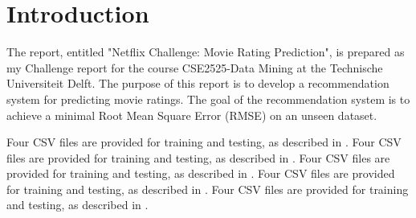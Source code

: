 \documentclass{ece}
\begin{document}
\body

\section{Introduction}

The report, entitled "Netflix Challenge: Movie Rating Prediction", is prepared as my Challenge report for the course CSE2525-Data Mining at the Technische Universiteit Delft.
The purpose of this report is to develop a recommendation system for predicting movie ratings.
The goal of the recommendation system is to achieve a minimal Root Mean Square Error (RMSE) on an unseen dataset.

Four CSV files are provided for training and testing, as described in .
Four CSV files are provided for training and testing, as described in .
Four CSV files are provided for training and testing, as described in .
Four CSV files are provided for training and testing, as described in .
Four CSV files are provided for training and testing, as described in .
\end{document}
